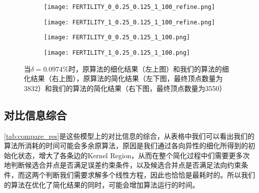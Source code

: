 \begin{figure}[H]
  \centering
  \begin{subfigure}[b]{0.4\textwidth}
    \texttt{[image: FERTILITY\_0\_0.25\_0.125\_1\_100\_refine.png]}
  \end{subfigure}
  \begin{subfigure}[b]{0.4\textwidth}
    \texttt{[image: FERTILITY\_1\_0.25\_0.125\_1\_100\_refine.png]}
  \end{subfigure}
  \begin{subfigure}[b]{0.4\textwidth}
    \texttt{[image: FERTILITY\_0\_0.25\_0.125\_1\_100.png]}
  \end{subfigure}
  \begin{subfigure}[b]{0.4\textwidth}
    \texttt{[image: FERTILITY\_1\_0.25\_0.125\_1\_100.png]}
  \end{subfigure}
  \caption[当$\delta=0.0974\%$时fertility结果对比]{当$\delta=0.0974\%$时，原算法的细化结果（左上图）和我们的算法的细化结果（右上图），原算法的简化结果（左下图，最终顶点数量为3832）和我们的算法的简化结果（右下图，最终顶点数量为3550）}
  \label{fig:fertility-res2}
\end{figure}

\subsection{对比信息综合}
\autoref{tab:compare_res}是这些模型上的对比信息的综合，从表格中我们可以看出我们的算法所消耗的时间可能会多余原算法，原因是我们通过各向异性的细化所得到的初始化状态，增大了各条边的Kernel Region，从而在整个简化过程中们需要更多次地判断候选合并点是否满足误差约束条件，以及候选合并点是否满足法向约束条件，而这两个判断我们需要求解多个线性方程，因此也恰恰是最耗时的。所以我们的算法在优化了简化结果的同时，可能会增加算法运行的时间。

